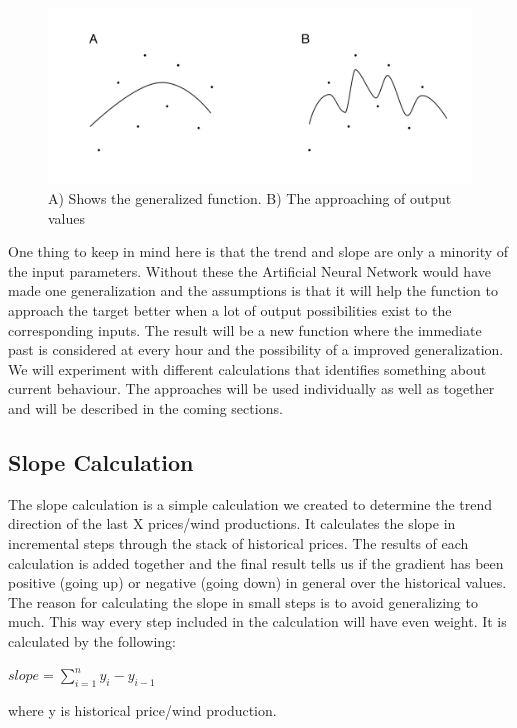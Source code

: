 \begin{figure}[h]
\centering
\includegraphics[width=0.99\linewidth,natwidth=898,natheight=587]{billeder/WP_000057.jpg}
\caption{A) Shows the generalized function. B) The approaching of output values}
\label{fig:WP}
\end{figure}

One thing to keep in mind here is that the trend and slope are only a minority of the input parameters. Without these the Artificial Neural Network would have made one generalization and the assumptions is that it will help the function to approach the target better when a lot of output possibilities exist to the corresponding inputs. The result will be a new function where the immediate past is considered at every hour and the possibility of a improved generalization. We will experiment with different calculations that identifies something about current behaviour. The approaches will be used individually as well as together and will be described in the coming sections.

\subsection{Slope Calculation}
\label{sec:curveAnalysis}
The slope calculation is a simple calculation we created to determine the trend direction of the last X prices/wind productions. It calculates the slope in incremental steps through the stack of historical prices. The results of each calculation is added together and the final result tells us if the gradient has been positive (going up) or negative (going down) in general over the historical values. The reason for calculating the slope in small steps is to avoid generalizing to much. This way every step included in the calculation will have even weight. It is calculated by the following:
\begin{center}
$slope = \sum_{i=1}^{n} y_i - y_{i-1}$
\end{center}
\noindent where y is historical price/wind production.

